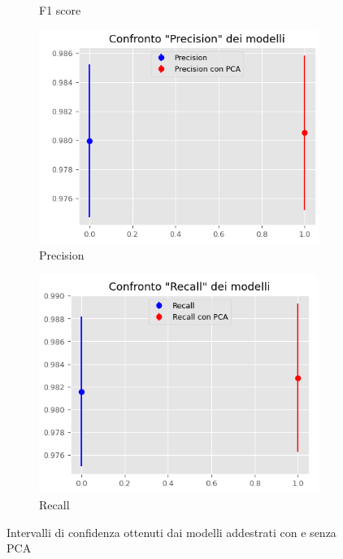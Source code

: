 \begin{figure}[!ht]
\begin{subfigure}[b]{0.4\textwidth}
        \caption{F1 score}
        \label{fig:f1}
    \end{subfigure}
    \hfill
    \begin{subfigure}[b]{0.4\textwidth}
        \centering
        \includegraphics[width=\textwidth]{img/rete/intervalliPrecision.png}
        \caption{Precision}
        \label{fig:precision}
    \end{subfigure}
    \hfill
    \begin{subfigure}[b]{0.4\textwidth}
        \centering
        \includegraphics[width=\textwidth]{img/rete/intervalliRecall.png}
        \caption{Recall}
        \label{fig:recall}
    \end{subfigure}
    \caption{Intervalli di confidenza ottenuti dai modelli addestrati con e senza PCA}
    \label{fig:intervalliConfidenzaPCA}
\end{figure}
